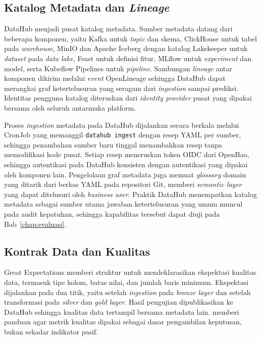 \subsection{Katalog Metadata dan \textit{Lineage}}
\label{subsec:katalog-lineage}

DataHub menjadi pusat katalog metadata. Sumber metadata datang dari beberapa komponen, yaitu Kafka untuk \textit{topic} dan skema, ClickHouse \autocite{clickhouse2024} untuk tabel pada \textit{warehouse}, MinIO dan Apache Iceberg dengan katalog Lakekeeper \autocite{lakekeeper2025} untuk \textit{dataset} pada \textit{data lake}, Feast \autocite{feast2024} untuk definisi fitur, MLflow untuk \textit{experiment} dan model, serta Kubeflow Pipelines untuk \textit{pipeline}. Sambungan \textit{lineage} antar komponen dikirim melalui \textit{event} OpenLineage \autocite{openlineage2025} sehingga DataHub dapat merangkai graf ketertelusuran yang seragam dari \textit{ingestion} sampai prediksi. Identitas pengguna katalog diteruskan dari \textit{identity provider} pusat yang dipakai bersama oleh seluruh antarmuka platform.

Proses \textit{ingestion} metadata pada DataHub dijalankan secara berkala melalui CronJob yang memanggil \texttt{datahub ingest} dengan resep YAML per sumber, sehingga penambahan sumber baru tinggal menambahkan resep tanpa memodifikasi kode pusat. Setiap resep meneruskan token OIDC dari OpenBao, sehingga autentikasi pada DataHub konsisten dengan autentikasi yang dipakai oleh komponen lain. Pengelolaan graf metadata juga memuat \textit{glossary} domain yang ditarik dari berkas YAML pada repositori Git, memberi \textit{semantic layer} yang dapat ditelusuri oleh \textit{business user}. Praktik DataHub \autocite{datahub2024} menempatkan katalog metadata sebagai sumber utama jawaban ketertelusuran yang umum muncul pada audit kepatuhan, sehingga kapabilitas tersebut dapat diuji pada Bab~\ref{chap:evaluasi}.

\subsection{Kontrak Data dan Kualitas}
\label{subsec:kontrak-data}

Great Expectations memberi struktur untuk mendeklarasikan ekspektasi kualitas data, termasuk tipe kolom, batas nilai, dan jumlah baris minimum. Ekspektasi dijalankan pada dua titik, yaitu setelah \textit{ingestion} pada \textit{bronze layer} dan setelah transformasi pada \textit{silver} dan \textit{gold layer}. Hasil pengujian dipublikasikan ke DataHub sehingga kualitas data tertampil bersama metadata lain. \textcite{chien2022improve} memberi panduan agar metrik kualitas dipakai sebagai dasar pengambilan keputusan, bukan sekadar indikator pasif.

